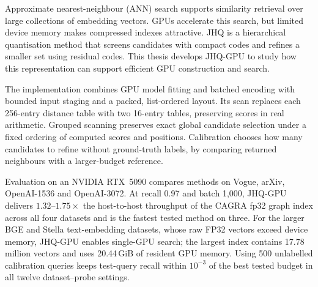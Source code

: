 Approximate nearest-neighbour (ANN) search supports similarity retrieval
over large collections of embedding vectors. GPUs accelerate this search,
but limited device memory makes compressed indexes attractive. JHQ is a
hierarchical quantisation method that screens candidates with compact
codes and refines a smaller set using residual codes. This thesis develops
JHQ-GPU to study how this representation can support efficient GPU
construction and search.

The implementation combines GPU model fitting and batched encoding with
bounded input staging and a packed, list-ordered layout. Its scan replaces
each 256-entry distance table with two 16-entry tables, preserving scores
in real arithmetic. Grouped scanning preserves exact global candidate
selection under a fixed ordering of computed scores and positions. Calibration chooses how
many candidates to refine without ground-truth labels, by comparing
returned neighbours with a larger-budget reference.

Evaluation on an NVIDIA RTX~5090 compares methods on Vogue, arXiv,
OpenAI-1536 and OpenAI-3072. At recall 0.97 and batch 1,000, JHQ-GPU
delivers $1.32$--$1.75\times$ the host-to-host throughput of the CAGRA fp32 graph index
across all four datasets and is the fastest tested method on three.
For the larger BGE and Stella text-embedding datasets, whose raw FP32 vectors exceed
device memory, JHQ-GPU enables single-GPU search; the largest index
contains 17.78 million vectors and uses 20.44\,GiB of resident GPU memory.
Using 500 unlabelled calibration queries keeps test-query recall within
$10^{-3}$ of the best tested budget in all twelve dataset--probe settings.
